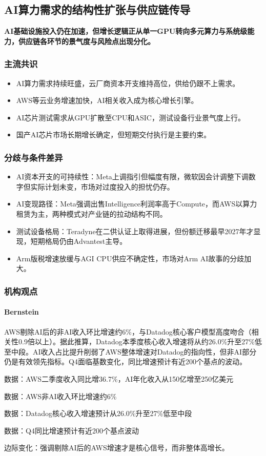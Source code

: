 \documentclass[11pt]{ctexart}
\begin{document}
\subsection{AI算力需求的结构性扩张与供应链传导}
\textbf{AI基础设施投入仍在加速，但增长逻辑正从单一GPU转向多元算力与系统级能力，供应链各环节的景气度与风险点出现分化。}
\subsubsection*{主流共识}
\begin{itemize}
  \item AI算力需求持续旺盛，云厂商资本开支维持高位，供给仍跟不上需求。
  \item AWS等云业务增速加快，AI相关收入成为核心增长引擎。
  \item AI芯片测试需求从GPU扩散至CPU和ASIC，测试设备行业景气度上行。
  \item 国产AI芯片市场长期增长确定，但短期交付执行是主要约束。
\end{itemize}
\subsubsection*{分歧与条件差异}
\begin{itemize}
  \item AI资本开支的可持续性：Meta上调指引但幅度有限，微软因会计调整下调数字但实际计划未变，市场对过度投入的担忧仍存。
  \item AI变现路径：Meta强调出售Intelligence利润率高于Compute，而AWS以算力租赁为主，两种模式对产业链的拉动结构不同。
  \item 测试设备格局：Teradyne在二供认证上取得进展，但份额迁移最早2027年才显现，短期格局仍由Advantest主导。
  \item Arm版税增速放缓与AGI CPU供应不确定性，市场对Arm AI故事的分歧加大。
\end{itemize}
\subsubsection*{机构观点}
\paragraph{Bernstein} AWS剔除AI后的非AI收入环比增速约6\%，与Datadog核心客户模型高度吻合（相关性0.9倍以上）。据此推算，Datadog本季度核心收入增速将从约26.0\%升至27\%低至中段。AI收入占比提升削弱了AWS整体增速对Datadog的指向性，但非AI部分仍是有效领先指标。Q4面临基数变化，同比增速预计有近200个基点的波动。
{\small\color{refgray}数据：AWS二季度收入同比增36.7\%，AI年化收入从150亿增至250亿美元\par}
{\small\color{refgray}数据：AWS非AI收入环比增速约6\%\par}
{\small\color{refgray}数据：Datadog核心收入增速预计从26.0\%升至27\%低至中段\par}
{\small\color{refgray}数据：Q4同比增速预计有近200个基点波动\par}
{\small\color{refgray}边际变化：强调剔除AI后的AWS增速才是核心信号，而非整体高增长。\par}
\end{document}

